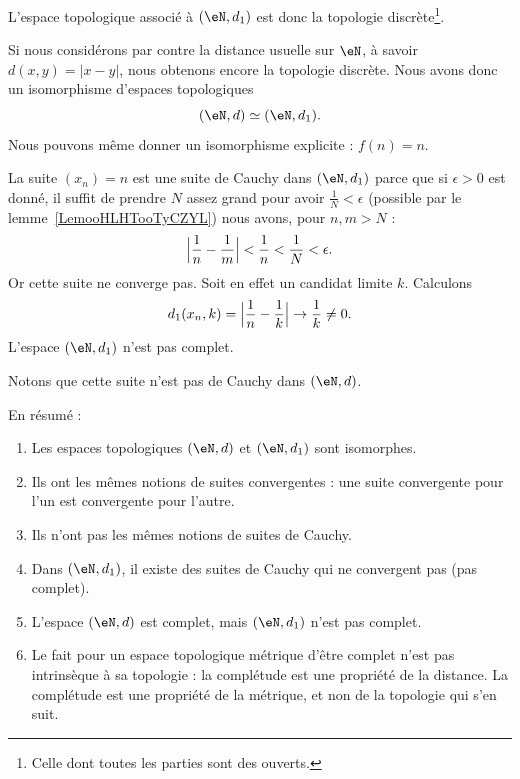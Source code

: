 \begin{example}
	L'espace topologique associé à \( (\eN,d_1)\) est donc la topologie discrète\footnote{Celle dont toutes les parties sont des ouverts.}.

	Si nous considérons par contre la distance usuelle sur \( \eN\), à savoir \( d(x,y)=| x-y |\), nous obtenons encore la topologie discrète. Nous avons donc un isomorphisme d'espaces topologiques
	\begin{equation}
		(\eN,d)\simeq (\eN,d_1).
	\end{equation}
	Nous pouvons même donner un isomorphisme explicite : \( f(n)=n\).

	La suite \( (x_n)=n\) est une suite de Cauchy dans \( (\eN,d_1)\) parce que si \( \epsilon>0\) est donné, il suffit de prendre \( N\) assez grand pour avoir \( \frac{1}{ N }<\epsilon\) (possible par le lemme~\ref{LemooHLHTooTyCZYL}) nous avons, pour \( n,m>N\) :
	\begin{equation}
		\Bigl| \frac{1}{ n }-\frac{1}{ m } \Bigr|<\frac{1}{ n }<\frac{1}{ N }<\epsilon.
	\end{equation}
	Or cette suite ne converge pas. Soit en effet un candidat limite \( k\). Calculons
	\begin{equation}
		d_1(x_n,k)= \Bigl| \frac{1}{ n }-\frac{1}{ k } \Bigr |\to \frac{1}{ k }\neq 0.
	\end{equation}
	L'espace \( (\eN,d_1)\) n'est pas complet.

	Notons que cette suite n'est pas de Cauchy dans \( (\eN,d)\).

	En résumé :
	\begin{enumerate}
		\item
		      Les espaces topologiques \( (\eN,d)\) et \( (\eN,d_1)\) sont isomorphes.
		\item
		      Ils ont les mêmes notions de suites convergentes : une suite convergente pour l'un est convergente pour l'autre.
		\item
		      Ils n'ont pas les mêmes notions de suites de Cauchy.
		\item
		      Dans \(  (\eN,d_1)  \), il existe des suites de Cauchy qui ne convergent pas (pas complet).
		\item
		      L'espace \( (\eN,d)\) est complet, mais \( (\eN,d_1)\) n'est pas complet.
		\item
		      Le fait pour un espace topologique métrique d'être complet n'est pas intrinsèque à sa topologie : la complétude est une propriété de la distance. La complétude est une propriété de la métrique, et non de la topologie qui s'en suit.
	\end{enumerate}
\end{example}



